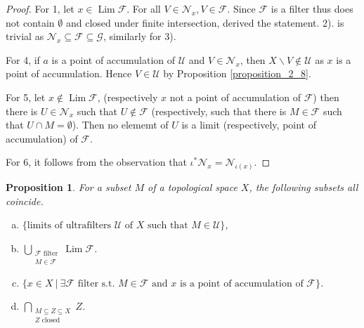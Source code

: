 \documentclass[8pt]{article}
\numberwithin{equation}{section}
\newtheorem{proposition}{Proposition}[subsection]
\DeclareMathOperator{\Lim}{Lim}
\newcommand{\F}[0]{\mathcal{F}}
\newcommand{\sep}[0]{\:|\:}
\newcommand{\Nfil}[0]{\mathcal{N}}
\begin{document}
\begin{proof}
    For 1, let $x\in\Lim\F$. For all $V\in\Nfil_x,V\in\F$. Since $\F$ is a filter thus does not contain $\emptyset$ and closed under finite intersection, derived the statement. 2). is trivial as $\Nfil_x\subseteq\F\subseteq\mathcal{G}$, similarly for 3).
    \par For 4, if $a$ is a point of accumulation of $\mathcal{U}$ and $V\in\mathcal{N}_x$, then $X\backslash V\not\in\mathcal{U}$ as $x$ is a point of accumulation. Hence $V\in\mathcal{U}$ by Proposition \ref{proposition_2_8}.
    \par For 5, let $x\not\in\Lim\mathcal{F}$, (respectively $x$ not a point of accumulation of $\mathcal{F}$) then there is $U\in\mathcal{N}_x$ such that $U\not\in\mathcal{F}$ (respectively, such that there is $M\in\mathcal{F}$ such that $U\cap M=\emptyset$). Then no elememt of $U$ is a limit (respectively, point of accumulation) of $\mathcal{F}$. 
    \par For 6, it follows from the observation that $\iota^*\Nfil_x=\Nfil_{\iota(x)}$. 
\end{proof}
\begin{proposition}
    \label{proposition_1}
    For a subset $M$ of a topological space $X$, the following subsets all coincide.
    \begin{enumerate}[a.]
        \item $\{\text{limits of ultrafilters $\mathcal{U}$ of $X$ such that $M\in\mathcal{U}$}\}$,
        \item $\bigcup_{\substack{\text{$\mathcal{F}$ filter}\\\text{$M\in\mathcal{F}$}}}\Lim\mathcal{F}$. 
        \item $\{x\in X\sep \text{$\exists \mathcal{F}$ filter s.t. $M\in\mathcal{F}$ and $x$ is a point of accumulation of $\mathcal{F}$}\}$.
        \item $\bigcap_{\substack{M\subseteq Z\subseteq X\\\text{$Z$ closed}}}Z$.
    \end{enumerate}
\end{proposition}
\end{document}
